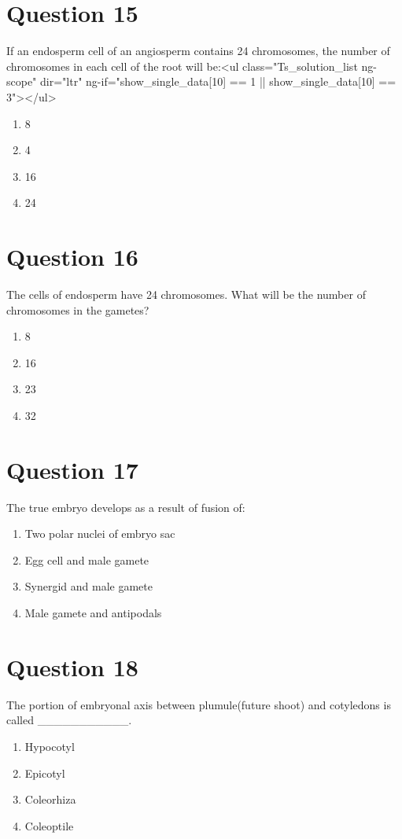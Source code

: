 \documentclass{article}
\begin{document}
\section*{Question 15}
If an endosperm cell of an angiosperm contains 24 chromosomes, the number of chromosomes in each cell of the root will be:\newline<ul class="Ts_solution_list ng-scope" dir="ltr" ng-if="show_single_data[10] == 1 || show_single_data[10] == 3"></ul>
\begin{enumerate}[label=(\alph*)]
\item 8
\item 4
\item 16
\item 24
\end{enumerate}
\newpage
\section*{Question 16}
The cells of endosperm have 24 chromosomes. What will be the number of chromosomes in the gametes?\newline
\begin{enumerate}[label=(\alph*)]
\item 8
\item 16
\item 23
\item 32
\end{enumerate}
\newpage
\section*{Question 17}
The true embryo develops as a result of fusion of:
\begin{enumerate}[label=(\alph*)]
\item Two polar nuclei of embryo sac
\item Egg cell and male gamete
\item Synergid and male gamete
\item Male gamete and antipodals
\end{enumerate}
\newpage
\section*{Question 18}
The portion of embryonal axis between plumule(future shoot) and cotyledons is called ___________.
\begin{enumerate}[label=(\alph*)]
\item Hypocotyl
\item Epicotyl
\item Coleorhiza
\item Coleoptile
\end{enumerate}
\newpage
\end{document}
